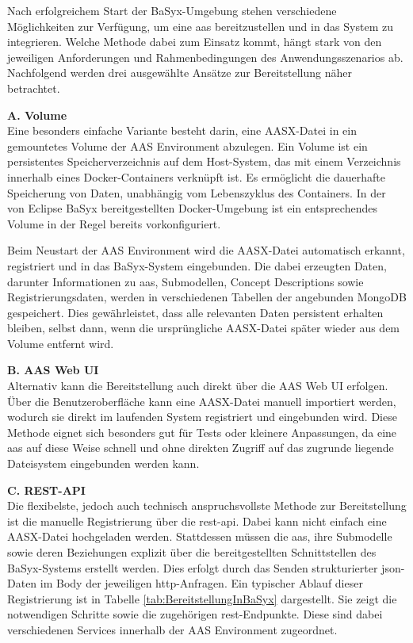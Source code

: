 Nach erfolgreichem Start der BaSyx-Umgebung stehen verschiedene Möglichkeiten zur Verfügung, um eine \acs{aas} bereitzustellen und in das System zu integrieren. 
Welche Methode dabei zum Einsatz kommt, hängt stark von den jeweiligen Anforderungen und Rahmenbedingungen des Anwendungsszenarios ab.
Nachfolgend werden drei ausgewählte Ansätze zur Bereitstellung näher betrachtet.

\vspace{0.5em}
\noindent\textbf{A. Volume}\\
Eine besonders einfache Variante besteht darin, eine AASX-Datei in ein gemountetes Volume der AAS Environment abzulegen.
Ein Volume ist ein persistentes Speicherverzeichnis auf dem Host-System, das mit einem Verzeichnis innerhalb eines Docker-Containers verknüpft ist.
Es ermöglicht die dauerhafte Speicherung von Daten, unabhängig vom Lebenszyklus des Containers.
In der von Eclipse BaSyx bereitgestellten Docker-Umgebung ist ein entsprechendes Volume in der Regel bereits vorkonfiguriert.

Beim Neustart der AAS Environment wird die AASX-Datei automatisch erkannt, registriert und in das BaSyx-System eingebunden.
Die dabei erzeugten Daten, darunter Informationen zu \acs{aas}, Submodellen, Concept Descriptions sowie Registrierungsdaten, werden in verschiedenen Tabellen der angebunden MongoDB gespeichert.
Dies gewährleistet, dass alle relevanten Daten persistent erhalten bleiben, selbst dann, wenn die ursprüngliche AASX-Datei später wieder aus dem Volume entfernt wird.

\vspace{0.5em}
\noindent\textbf{B. AAS Web UI}\\
Alternativ kann die Bereitstellung auch direkt über die AAS Web UI erfolgen.
Über die Benutzeroberfläche kann eine AASX-Datei manuell importiert werden, wodurch sie direkt im laufenden System registriert und eingebunden wird.
Diese Methode eignet sich besonders gut für Tests oder kleinere Anpassungen, da eine \acs{aas} auf diese Weise schnell und ohne direkten Zugriff auf das zugrunde liegende Dateisystem eingebunden werden kann.

\vspace{0.5em}
\noindent\textbf{C. REST-API}\\
Die flexibelste, jedoch auch technisch anspruchsvollste Methode zur Bereitstellung ist die manuelle Registrierung über die \acs{rest}-\acs{api}. 
Dabei kann nicht einfach eine AASX-Datei hochgeladen werden. 
Stattdessen müssen die \acs{aas}, ihre Submodelle sowie deren Beziehungen explizit über die bereitgestellten Schnittstellen des BaSyx-Systems erstellt werden. 
Dies erfolgt durch das Senden strukturierter \acs{json}-Daten im Body der jeweiligen \acs{http}-Anfragen.
Ein typischer Ablauf dieser Registrierung ist in Tabelle \ref{tab:BereitstellungInBaSyx} dargestellt. 
Sie zeigt die notwendigen Schritte sowie die zugehörigen \acs{rest}-Endpunkte.
Diese sind dabei verschiedenen Services innerhalb der AAS Environment zugeordnet.

